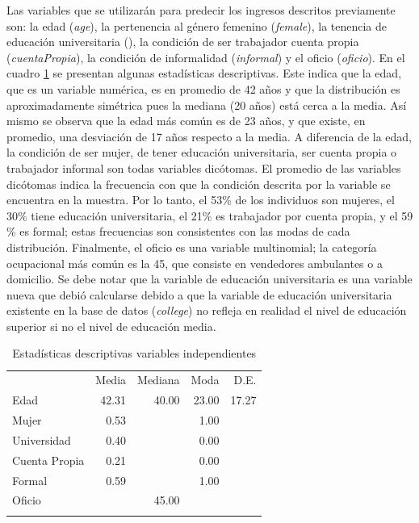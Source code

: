 \documentclass[11pt,a4paper]{article}
\begin{document}
 Las variables que se utilizarán para predecir los ingresos descritos previamente son: la edad (\textit{age}), la pertenencia al género femenino (\textit{female}), la tenencia de educación universitaria (), la condición de ser trabajador cuenta propia (\textit{cuentaPropia}), la condición de informalidad (\textit{informal})  y el oficio (\textit{oficio}). 
 En el cuadro \ref{tbl:estadisticasDescInd} se presentan algunas estadísticas descriptivas. Este indica que la edad, que es un variable numérica, es en promedio de 42 años y que la distribución es aproximadamente simétrica pues la mediana (20 años) está cerca a la media. Así mismo se observa que la edad más común es de 23 años, y que existe, en promedio, una desviación de 17 años respecto a la media. 
A diferencia de la edad, la condición de ser mujer, de tener educación universitaria, ser cuenta propia o trabajador informal son todas variables dicótomas. El promedio de las variables dicótomas indica la frecuencia con que la condición descrita por la variable se encuentra en la muestra. Por lo tanto, el 53\% de los individuos son mujeres, el 30\% tiene educación universitaria, el 21\% es trabajador por cuenta propia, y el 59 \% es formal; estas frecuencias son consistentes con las modas de cada distribución. 
Finalmente, el oficio es una variable multinomial; la categoría ocupacional más común es la 45, que consiste en vendedores ambulantes o a domicilio. Se debe notar que la variable de educación universitaria es una variable nueva que debió calcularse debido a que la variable de educación universitaria existente en la base de datos (\textit{college}) no refleja en realidad el nivel de educación superior si no el nivel de educación media. 

\begin{table}[htp]
  \centering
  \caption{Estadísticas descriptivas variables independientes} 
  \label{tab:descriptive_independent}
  \begingroup\fontsize{9pt}{10pt}\selectfont
  \begin{tabular}{lrrrr}
    \hline
  \addlinespace
    & Media & Mediana & Moda & D.E. \\
  \addlinespace
   \hline
   Edad & 42.31 & 40.00 & 23.00 & 17.27 \\ 
    Mujer & 0.53 &  & 1.00 &  \\ 
    Universidad & 0.40 &  & 0.00 &  \\ 
    Cuenta Propia & 0.21 & & 0.00 &  \\ 
    Formal & 0.59 & & 1.00 & \\ 
    Oficio &  & 45.00 & &  \\ 
     \addlinespace
  \hline
  \addlinespace
  \end{tabular}
  \endgroup
  \label{tbl:estadisticasDescInd}
  \end{table}
  
\end{document}
